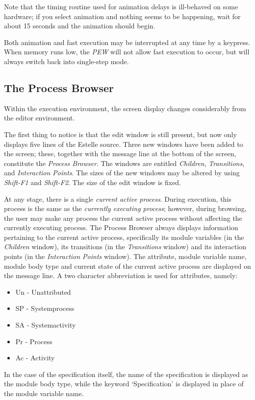 Note that the timing routine used for animation delays is
ill-behaved on some hardware; if you select animation and nothing
seems to be happening, wait for about 15 seconds and the animation
should begin.

Both animation and fast execution may be interrupted at any time
by a keypress. When memory runs low, the {\em PEW} will not allow
fast execution to occur, but will always switch back into single-step
mode.

\subsection[The Process Browser]{The Process Browser}

Within the execution environment, the screen display changes
considerably from the editor environment.

The first thing to notice is that the edit window is still present,
but now only displays five lines of the Estelle source. Three new
windows have been added to the screen; these, together with the
message line at the bottom of the screen, constitute the {\em Process
Browser}. The windows are entitled {\em Children}, {\em Transitions},
and {\em Interaction Points}. The sizes of the new windows may be
altered by using {\em Shift-F1} and {\em Shift-F2}. The size of the
edit window is fixed.

At any stage, there is a single {\em current active process}.
During execution, this process is the same as the {\em currently
executing process}; however, during browsing, the user may make any
process the current active process without affecting the currently
executing process. The Process Browser always displays information
pertaining to the current active process, specifically its module
variables (in the {\em Children} window), its transitions (in the {\em
Transitions} window) and its interaction points (in the {\em
Interaction Points} window). The attribute, module variable name,
module body type and current state of the current active process are displayed on the
message line. A two character abbreviation is used for attributes,
namely:
\begin{itemize}
\item Un - Unattributed
\item SP - Systemprocess
\item SA - Systemactivity
\item Pr - Process
\item Ac - Activity
\end{itemize}
In the case of the specification itself, the name of the
specification is displayed as the module body type, while the keyword
`Specification' is displayed in place of the module variable name.

